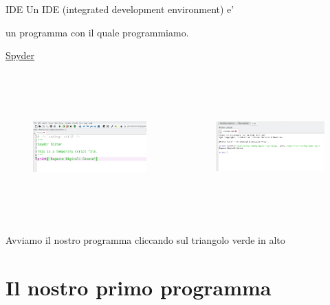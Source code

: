 \documentclass{beamer}
\begin{document}
\begin{frame}{IDE}
Un IDE (integrated development environment) e'

un programma con il quale programmiamo.
\vspace{4.0mm}
\begin{center}
    \href{https://www.spyder-ide.org/}{Spyder}
\end{center}

	\begin{columns}
		\begin{column}{3cm}
			\begin{figure}
   				\includegraphics[height=5cm]{images/esempio_editor_spyder.png}
			\end{figure}
		\end{column}
		\begin{column}{6cm}
			\begin{figure}
   				\includegraphics[height=5cm]{images/esempio_console_spyder.png}
			\end{figure}
		\end{column}
	\end{columns}
Avviamo il nostro programma cliccando sul triangolo verde in alto	
\end{frame}








\section{Il nostro primo programma}
\end{document}
